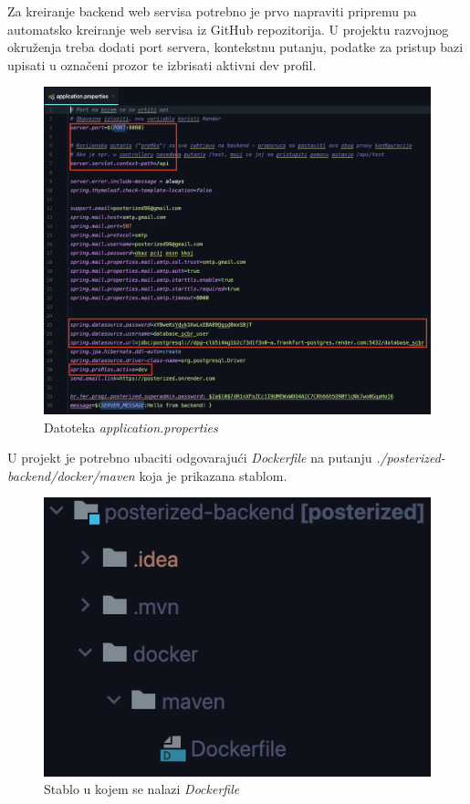 \begin{enumerate}
			\pagebreak
			 Za kreiranje backend web servisa potrebno je prvo napraviti pripremu pa automatsko kreiranje web servisa iz GitHub repozitorija. U projektu razvojnog okruženja treba dodati port servera, kontekstnu putanju, podatke za pristup bazi upisati u označeni prozor te izbrisati aktivni dev profil.
			\begin{figure}[H]
				\includegraphics[scale=0.4]{slike/deploy/backend8.png} %
				\centering
				\caption{Datoteka \textit{application.properties}}
				\label{fig:promjene}
			\end{figure}
			U projekt je potrebno ubaciti odgovarajući \textit{Dockerfile} na putanju \textit{./posterized-backend/docker/maven} koja je prikazana stablom.
			\begin{figure}[H]
				\includegraphics[scale=0.8]{slike/deploy/backend7.png} %
				\centering
				\caption{Stablo u kojem se nalazi \textit{Dockerfile}}
				\label{fig:promjene}
			\end{figure}
			

\end{enumerate}
